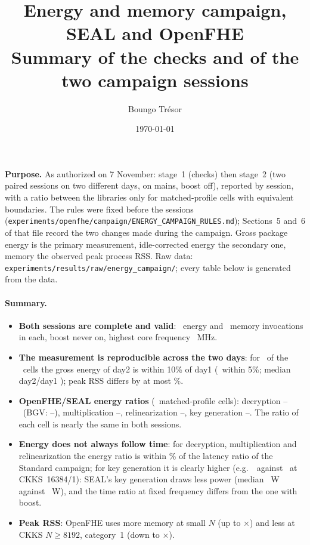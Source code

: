 \documentclass[11pt]{article}
\title{Energy and memory campaign, SEAL and OpenFHE\\[2pt]
\large Summary of the checks and of the two campaign sessions}
\author{Boungo Tr\'esor}
\date{\today}
\begin{document}
\maketitle

\noindent\textbf{Purpose.} As authorized on 7 November: stage~1 (checks) then stage~2 (two paired sessions on two different days, on mains, boost off), reported by session, with a ratio between the libraries only for matched-profile cells with equivalent boundaries. The rules were fixed before the sessions (\texttt{experiments/openfhe/campaign/ENERGY\_CAMPAIGN\_RULES.md}); Sections~5 and~6 of that file record the two changes made during the campaign. Gross package energy is the primary measurement, idle-corrected energy the secondary one, memory the observed peak process RSS. Raw data: \texttt{experiments/results/raw/energy\_campaign/}; every table below is generated from the data.

\paragraph{Summary.}
\begin{itemize}[leftmargin=*, itemsep=2pt]
  \item \textbf{Both sessions are complete and valid}: \nEnergyOne\ energy and \nMemOne\ memory invocations in each, boost never on, highest core frequency \freqMaxTwo~MHz.
  \item \textbf{The measurement is reproducible across the two days}: for \acrossTen\ of the \acrossN\ cells the gross energy of day2 is within 10\% of day1 (\acrossFive\ within 5\%; median day2/day1 \acrossMedian); peak RSS differs by at most \rssAcrossMaxPct\%.
  \item \textbf{OpenFHE/SEAL energy ratios} (\nRatioCells\ matched-profile cells): decryption \rDecNoBgvMin--\rDecNoBgvMax\ (BGV: \rBgvMin--\rBgvMax), multiplication \rMulMin--\rMulMax, relinearization \rRelinMin--\rRelinMax, key generation \rKgMin--\rKgMax. The ratio of each cell is nearly the same in both sessions.
  \item \textbf{Energy does not always follow time}: for decryption, multiplication and relinearization the energy ratio is within \latDevMaxPct\% of the latency ratio of the Standard campaign; for key generation it is clearly higher (e.g.\ \kgEnBig\ against \kgLatBig\ at CKKS~16384/1): SEAL's key generation draws less power (median \kgPowSeal~W against \kgPowOfhe~W), and the time ratio at fixed frequency differs from the one with boost.
  \item \textbf{Peak RSS}: OpenFHE uses more memory at small $N$ (up to $\times$\rssRatioMax) and less at CKKS $N\ge 8192$, category~1 (down to $\times$\rssRatioMin).
\end{itemize}
\end{document}
